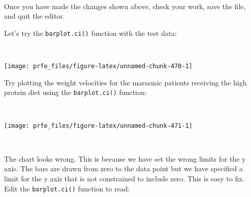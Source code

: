 \documentclass[
  12pt,
  a4paper]{book}
\newenvironment{Shaded}{\begin{snugshade}}{\end{snugshade}}
\newcommand{\FunctionTok}[1]{\textcolor[rgb]{0.00,0.00,0.00}{#1}}
\newcommand{\NormalTok}[1]{#1}
\newcommand{\SpecialCharTok}[1]{\textcolor[rgb]{0.00,0.00,0.00}{#1}}
\begin{document}
~

Once you have made the changes shown above, check your work, save the file, and quit the editor.

Let's try the \texttt{barplot.ci()} function with the test data:

~

\begin{Shaded}
\end{Shaded}

\begin{center}\texttt{[image: prfe\_files/figure-latex/unnamed-chunk-470-1]} \end{center}

\newpage

Try plotting the weight velocities for the marasmic patients receiving the high protein diet using the \texttt{barplot.ci()} function:

~

\begin{Shaded}
\end{Shaded}

\begin{center}\texttt{[image: prfe\_files/figure-latex/unnamed-chunk-471-1]} \end{center}

~

The chart looks wrong. This is because we have set the wrong limits for the y axis. The bars are drawn from zero to the data point but we have specified a limit for the y axis that is not constrained to include zero. This is easy to fix. Edit the \texttt{barplot.ci()} function to read:

~
\end{document}
